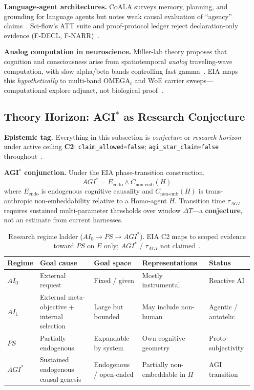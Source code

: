 \documentclass[11pt,a4paper]{article}
\theoremstyle{definition}
\begin{document}
\textbf{Language-agent architectures.} CoALA surveys memory, planning, and grounding for language agents but notes weak causal evaluation of ``agency'' claims~\cite{sumers2024cala}. Sci-flow's ATT suite and proof-protocol ledger reject declaration-only evidence (F-DECL, F-NARR)~\cite{kuznetsov2026proof}.

\textbf{Analog computation in neuroscience.} Miller-lab theory proposes that cognition and consciousness arise from spatiotemporal \emph{analog} traveling-wave computation, with slow alpha/beta bands controlling fast gamma~\cite{miller2026analog}. EIA maps this \emph{hypothetically} to multi-band $\mathrm{OMEGA}_t$ and WoE carrier sweeps---computational explore adjunct, not biological proof~\cite{kuznetsov2026omega}.

\subsection{Theory Horizon: AGI$^{*}$ as Research Conjecture}\label{sec:theory-horizon}

\textbf{Epistemic tag.} Everything in this subsection is \emph{conjecture} or \emph{research horizon} under active ceiling \textbf{C2}; \texttt{claim\_allowed=false}; \texttt{agi\_star\_claim=false} throughout~\cite{kuznetsov2026phase,kuznetsov2026star}.

\textbf{AGI$^{*}$ conjunction.} Under the EIA phase-transition construction,
\begin{equation}
AGI^{*} = E_{\mathrm{endo}} \land C_{\mathrm{non\text{-}emb}}(H)
\label{eq:agi-star}
\end{equation}
where $E_{\mathrm{endo}}$ is endogenous cognitive causality and $C_{\mathrm{non\text{-}emb}}(H)$ is trans-anthropic non-embeddability relative to a Homo-agent $H$. Transition time $\tau_{AGI}$ requires sustained multi-parameter thresholds over window $\Delta T$---a \textbf{conjecture}, not an estimate from current harnesses.

\begin{table}[H]
\centering\small
\begin{tabular}{lp{2.8cm}p{2.2cm}p{2.5cm}l}
\toprule Regime & Goal cause & Goal space & Representations & Status \\ \midrule
$AI_0$ & External request & Fixed / given & Mostly instrumental & Reactive AI \\
$AI_1$ & External meta-objective + internal selection & Large but bounded & May include non-human & Agentic / autotelic \\
$PS$ & Partially endogenous & Expandable by system & Own cognitive geometry & Proto-subjectivity \\
$AGI^{*}$ & Sustained endogenous causal genesis & Endogenous / open-ended & Partially non-embeddable in $H$ & AGI transition \\ \bottomrule
\end{tabular}
\caption{Research regime ladder ($AI_0 \to PS \to AGI^{*}$). EIA C2 maps to scoped evidence toward $PS$ on $E$ only; $AGI^{*}$ / $\tau_{AGI}$ not claimed~\cite{kuznetsov2026phase}.}
\label{tab:regimes}
\end{table}
\end{document}
